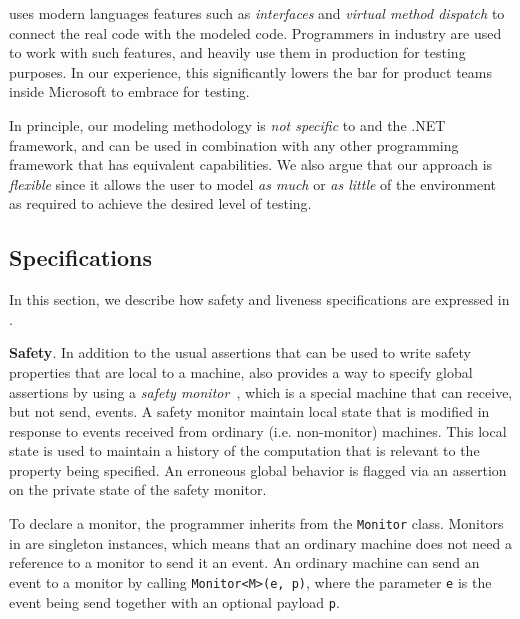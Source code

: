 \noindent
\psharp uses modern languages features such as \emph{interfaces} and \emph{virtual method dispatch} to connect the real code with the modeled code. Programmers in industry are used to work with such features, and heavily use them in production for testing purposes. In our experience, this significantly lowers the bar for product teams inside Microsoft to embrace \psharp for testing.

In principle, our modeling methodology is \emph{not specific} to \psharp and the .NET framework, and can be used in combination with any other programming framework that has equivalent capabilities. We also argue that our approach is \emph{flexible} since it allows the user to model \emph{as much} or \emph{as little} of the environment as required to achieve the desired level of testing.

\subsection{Specifications}
\label{sec:bg:bugs}

In  this section, we describe how safety and liveness specifications are expressed in \psharp.

\textbf{Safety}.
In addition to the usual assertions that can be used to write safety properties that are local to a machine, \psharp also provides a way to specify global assertions by using a \emph{safety monitor}~\cite{desai2015building}, which is a special machine that can receive, but not send, events. A safety monitor maintain local state that is modified in response to events received from ordinary (i.e. non-monitor) machines. This local state is used to maintain a history of the computation that is relevant to the property being specified. An erroneous global behavior is flagged via an assertion on the private state of the safety monitor.

To declare a monitor, the programmer inherits from the \psharp \texttt{Monitor} class. Monitors in \psharp are singleton instances, which means that an ordinary machine does not need a reference to a monitor to send it an event. An ordinary machine can send an event to a monitor by calling \texttt{Monitor<M>(e, p)}, where the parameter \texttt{e} is the event being send together with an optional payload \texttt{p}.


